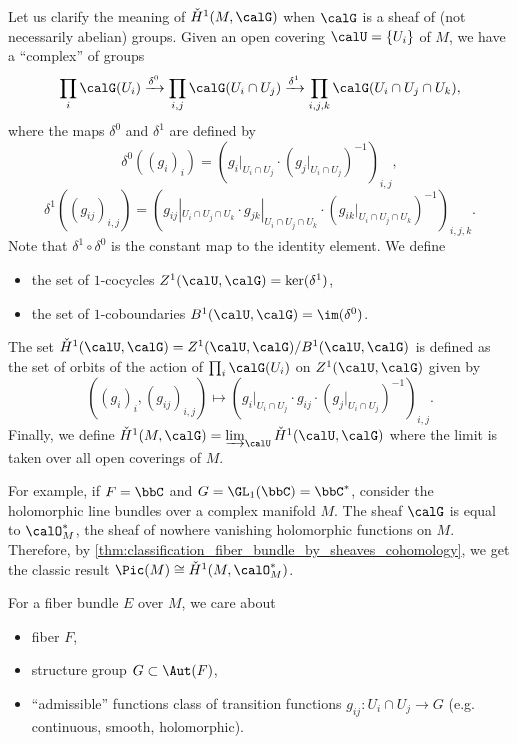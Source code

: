     \begin{remark}\label{rmk:Cech_cohomology_for_sheaves_of_groups}
        Let us clarify the meaning of \(\check{H}^1(M,\calG)\) when \(\calG\) is a sheaf of (not necessarily abelian) groups.
        Given an open covering \(\calU = \{U_i\}\) of \(M\), we have a ``complex'' of groups
        \[
            \prod_i \calG(U_i) \xrightarrow{\delta^0} \prod_{i,j} \calG(U_i \cap U_j) \xrightarrow{\delta^1} \prod_{i,j,k} \calG(U_i \cap U_j \cap U_k),
        \]
        where the maps \(\delta^0\) and \(\delta^1\) are defined by
        \[
            \delta^0((g_i)_i) = (g_i|_{U_i \cap U_j} \cdot (g_j|_{U_i \cap U_j})^{-1})_{i,j},
        \]
        \[
            \delta^1((g_{ij})_{i,j}) = (g_{ij}|_{U_i \cap U_j \cap U_k} \cdot g_{jk}|_{U_i \cap U_j \cap U_k} \cdot (g_{ik}|_{U_i \cap U_j \cap U_k})^{-1})_{i,j,k}.
        \]
        Note that \(\delta^1 \circ \delta^0\) is the constant map to the identity element.
        We define
        \begin{itemize}
            \item the set of \(1\)-cocycles \(Z^1(\calU,\calG) = \ker(\delta^1)\),
            \item the set of \(1\)-coboundaries \(B^1(\calU,\calG) = \im(\delta^0)\).

        \end{itemize}
        The set \(\check{H}^1(\calU,\calG) = Z^1(\calU,\calG) / B^1(\calU,\calG)\) is defined as the set of orbits of the action of \(\prod_i \calG(U_i)\) on \(Z^1(\calU,\calG)\) given by
        \[
            ( (g_i)_i , (g_{ij})_{i,j} ) \mapsto ( g_i|_{U_i \cap U_j} \cdot g_{ij} \cdot (g_j|_{U_i \cap U_j})^{-1} )_{i,j}.
        \]
        Finally, we define \(\check{H}^1(M,\calG) = \varinjlim_{\calU} \check{H}^1(\calU,\calG)\) where the limit is taken over all open coverings of \(M\).
    \end{remark}

    For example, if \(F = \bbC\) and \(G = \GL_1(\bbC) = \bbC^*\), consider the holomorphic line bundles over a complex manifold \(M\).
    The sheaf \(\calG\) is equal to \(\calO_M^*\), the sheaf of nowhere vanishing holomorphic functions on \(M\).
    Therefore, by \cref{thm:classification_fiber_bundle_by_sheaves_cohomology}, we get the classic result \(\Pic(M) \cong \check{H}^1(M, \calO_M^*)\).

    \begin{slogan}\label{slogan:things_of_fiber_bundles_we_care_about}
        For a fiber bundle \(E\) over \(M\), we care about
        \begin{itemize}
            \item fiber \(F\),
            \item structure group \(G \subset \Aut(F)\),
            \item ``admissible'' functions class of transition functions \(g_{ij}: U_i \cap U_j \to G\) (e.g. continuous, smooth, holomorphic).
        \end{itemize}
    \end{slogan}


